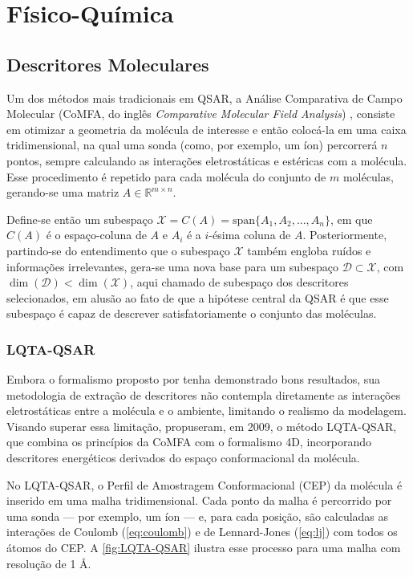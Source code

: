\section{Físico-Química} \label{sec:fisquim}

\subsection{Descritores Moleculares}

Um dos métodos mais tradicionais em QSAR, a Análise Comparativa de Campo Molecular (CoMFA, do inglês \textit{Comparative Molecular Field Analysis}) \cite{Cramer1988}, consiste em otimizar a geometria da molécula de interesse e então colocá-la em uma caixa tridimensional, na qual uma sonda (como, por exemplo, um íon) percorrerá \( n \) pontos, sempre calculando as interações eletrostáticas e estéricas com a molécula. Esse procedimento é repetido para cada molécula do conjunto de \( m \) moléculas, gerando-se uma matriz \( A \in \mathbb{R}^{m \times n} \).

Define-se então um subespaço \( \mathcal{X} = C(A) = \text{span}\{A_1, A_2, \ldots, A_n\} \), em que \( C(A) \) é o espaço-coluna de \( A \) e \( A_i \) é a \( i \)-ésima coluna de \( A \). Posteriormente, partindo-se do entendimento que o subespaço \( \mathcal{X} \) também engloba ruídos e informações irrelevantes, gera-se uma nova base para um subespaço \( \mathcal{D} \subset \mathcal{X} \), com \( \dim(\mathcal{D}) < \dim(\mathcal{X}) \), aqui chamado de subespaço dos descritores selecionados, em alusão ao fato de que a hipótese central da QSAR é que esse subespaço é capaz de descrever satisfatoriamente o conjunto das moléculas.

\subsubsection{LQTA-QSAR}

Embora o formalismo proposto por \textcite{Hopfinger1997} tenha demonstrado bons resultados, sua metodologia de extração de descritores não contempla diretamente as interações eletrostáticas entre a molécula e o ambiente, limitando o realismo da modelagem. Visando superar essa limitação, \textcite{LQTAQSAR2009} propuseram, em 2009, o método LQTA-QSAR, que combina os princípios da CoMFA \cite{Cramer1988} com o formalismo 4D, incorporando descritores energéticos derivados do espaço conformacional da molécula.

No LQTA-QSAR, o Perfil de Amostragem Conformacional (CEP) da molécula é inserido em uma malha tridimensional. Cada ponto da malha é percorrido por uma sonda --- por exemplo, um íon  --- e, para cada posição, são calculadas as interações de Coulomb (\autoref{eq:coulomb}) e de Lennard-Jones (\autoref{eq:lj}) com todos os átomos do CEP. A \autoref{fig:LQTA-QSAR} ilustra esse processo para uma malha com resolução de 1 \AA.


